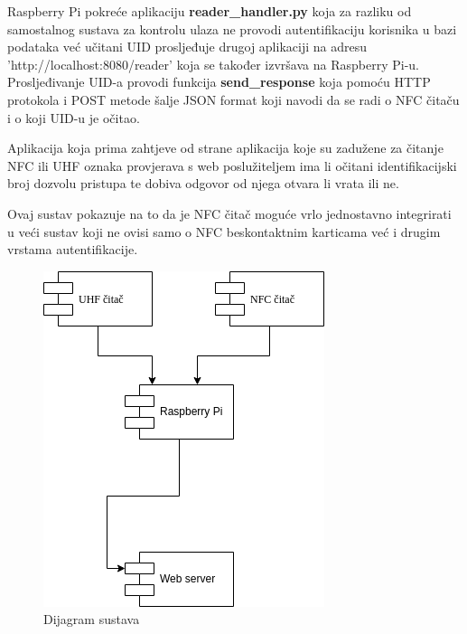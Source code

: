 \documentclass[times, utf8, zavrsni]{fer}
\begin{document}
Raspberry Pi pokreće aplikaciju \textbf{reader\_handler.py} koja za razliku od samostalnog sustava za kontrolu ulaza ne provodi autentifikaciju korisnika u bazi podataka već učitani UID prosljeđuje drugoj aplikaciji na adresu 'http://localhost:8080/reader' koja se također izvršava na Raspberry Pi-u. Prosljeđivanje UID-a provodi funkcija \textbf{send\_response} koja pomoću HTTP protokola i POST metode šalje JSON format koji navodi da se radi o NFC čitaču i o koji UID-u je očitao. 
\par
Aplikacija koja prima zahtjeve od strane aplikacija koje su zadužene za čitanje NFC ili UHF  oznaka provjerava s web poslužiteljem ima li očitani identifikacijski broj dozvolu pristupa  te dobiva odgovor od njega otvara li vrata ili ne.
\par 
Ovaj sustav pokazuje na to da je NFC čitač moguće vrlo jednostavno integrirati u veći sustav koji ne ovisi samo o NFC beskontaktnim karticama već i drugim vrstama autentifikacije.

\begin{figure}[h]
\includegraphics[scale=0.5]{vanjski.png}
\centering
\caption{Dijagram sustava}
\centering
\end{figure}
\end{document}
